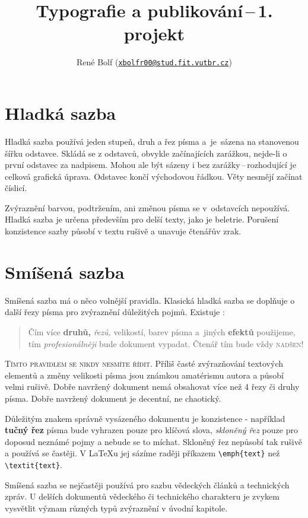 \documentclass[a4paper,10pt,twocolumn]{article}
\title{Typografie a publikování\,--\,1. projekt}
\author{René Bolf (\href{mailto:xbolfr00@stud.fit.vutbr.cz}{\nolinkurl{xbolfr00@stud.fit.vutbr.cz}})}
\date{}
\begin{document}
\maketitle
\section{Hladká sazba}
Hladká sazba používá jeden stupeň, druh a řez písma a~je~sázena na stanovenou šířku odstavce. Skládá se z odstavců, obvykle začínajících zarážkou, nejde-li o první odstavec za nadpisem. Mohou ale být sázeny i bez zarážky\,--\,rozhodující je celková grafická úprava. Odstavec končí východovou řádkou. Věty nesmějí začínat číslicí.

Zvýraznění barvou, podtržením, ani změnou písma se v~odstavcích nepoužívá. Hladká sazba je určena především pro delší texty, jako je beletrie. Porušení konzistence sazby působí v textu rušivě a unavuje čtenářův zrak.
\section{Smíšená sazba}
Smíšená sazba má o něco volnější pravidla. Klasická hladká sazba se doplňuje o další řezy písma pro zvýraznění důležitých pojmů. Existuje :

\begin{quote}

Čím více \textbf{druhů,} \textit{řezů,} {\footnotesize velikostí,} barev písma \textsf{a~jiných {\tiny \textbf{efektů}}} použijeme, tím \textit{profesionálněji} bude dokument vypadat. Čtenář tím bude {\LARGE vždy} {\Huge \textsc{nadšen!}}\end{quote}

\textsc{Tímto pravidlem se nikdy nesmíte řídit.} Příliš časté zvýrazňování textových elementů a změny velikosti písma jsou známkou amatérismu autora a působí velmi rušivě. Dobře navržený dokument nemá obsahovat více než
4 řezy či druhy písma. Dobře navržený dokument je decentní, ne chaotický.

Důležitým znakem správně vysázeného dokumentu je konzistence - například \textbf{tučný řez} písma bude vyhrazen pouze pro klíčová slova, \textsl{skloněný řez} pouze pro doposud neznámé pojmy a nebude se to míchat. Skloněný řez nepůsobí tak rušivě a používá se častěji. V \LaTeX u jej sázíme raději příkazem \verb|\emph{text}| než \verb|\textit{text}|.

Smíšená sazba se nejčastěji používá pro sazbu vědeckých článků a technických zpráv. U delších dokumentů vědeckého či technického charakteru je zvykem vysvětlit význam různých typů zvýraznění v úvodní kapitole.
\end{document}
